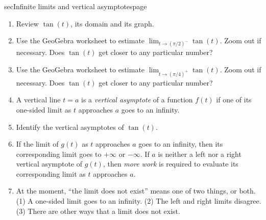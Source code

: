 \documentclass[../main.tex]{subfiles}
\begin{document}
\begin{outline}{sec}{Infinite limits and vertical asymptotes}{page}
  \label{act:infinity}
  \begin{enumerate}
    \item Review \(\tan(t)\), its domain and its graph.
    \item Use the GeoGebra worksheet to estimate \(\lim_{t \to (\pi/2)^{-}} \tan(t)\). Zoom out if necessary. Does \(\tan(t)\) get closer to any particular number?
    \item Use the GeoGebra worksheet to estimate \(\lim_{t \to (\pi/4)^{+}} \tan(t)\). Zoom out if necessary. Does \(\tan(t)\) get closer to any particular number?
    \item A vertical line \(t = a\) is a \emph{vertical asymptote} of a function \(f(t)\) if one of its one-sided limit as \(t\) approaches \(a\) goes to an infinity.
    \item Identify the vertical asymptotes of \(\tan(t)\).
    \item If the limit of \(g(t)\) as \(t\) approaches \(a\) goes to an infinity, then its corresponding limit goes to \(+ \infty\) or \(- \infty\). If \(a\) is neither a left nor a right vertical asymptote of \(g(t)\), then \emph{more work} is required to evaluate its corresponding limit as \(t\) approaches \(a\).
    \item At the moment, ``the limit does not exist'' means one of two things, or both.  (1) A one-sided limit goes to an infinity. (2) The left and right limits disagree. (3) There are other ways that a limit does not exist.
  \end{enumerate}
\end{outline}
\end{document}

